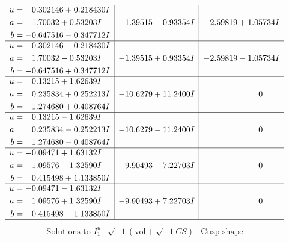 \documentclass[1p]{elsarticle_modified}
\theoremstyle{definition}
\newcommand{\I}{\sqrt{-1}}
\begin{document}
$$\begin{array}{c|c|c}
\begin{aligned}
u &= \phantom{-}0.302146 + 0.218430 I \\
a &= \phantom{-}1.70032 + 0.53203 I \\
b &= -0.647516 - 0.347712 I\end{aligned}
 & -1.39515 - 0.93354 I & -2.59819 + 1.05734 I \\ \hline\begin{aligned}
u &= \phantom{-}0.302146 - 0.218430 I \\
a &= \phantom{-}1.70032 - 0.53203 I \\
b &= -0.647516 + 0.347712 I\end{aligned}
 & -1.39515 + 0.93354 I & -2.59819 - 1.05734 I \\ \hline\begin{aligned}
u &= \phantom{-}0.13215 + 1.62639 I \\
a &= \phantom{-}0.235834 + 0.252213 I \\
b &= \phantom{-}1.274680 + 0.408764 I\end{aligned}
 & -10.6279 + 11.2400 I & \phantom{-0.000000 } 0 \\ \hline\begin{aligned}
u &= \phantom{-}0.13215 - 1.62639 I \\
a &= \phantom{-}0.235834 - 0.252213 I \\
b &= \phantom{-}1.274680 - 0.408764 I\end{aligned}
 & -10.6279 - 11.2400 I & \phantom{-0.000000 } 0 \\ \hline\begin{aligned}
u &= -0.09471 + 1.63132 I \\
a &= \phantom{-}1.09576 - 1.32590 I \\
b &= \phantom{-}0.415498 + 1.133850 I\end{aligned}
 & -9.90493 - 7.22703 I & \phantom{-0.000000 } 0 \\ \hline\begin{aligned}
u &= -0.09471 - 1.63132 I \\
a &= \phantom{-}1.09576 + 1.32590 I \\
b &= \phantom{-}0.415498 - 1.133850 I\end{aligned}
 & -9.90493 + 7.22703 I & \phantom{-0.000000 } 0\\
 \hline 
 \end{array}$$\newpage$$\begin{array}{c|c|c}  
\text{Solutions to }I^u_{1}& \I (\text{vol} + \sqrt{-1}CS) & \text{Cusp shape}\\
 \hline 
\begin{aligned}

\end{aligned}
\end{array}$$
\end{document}
